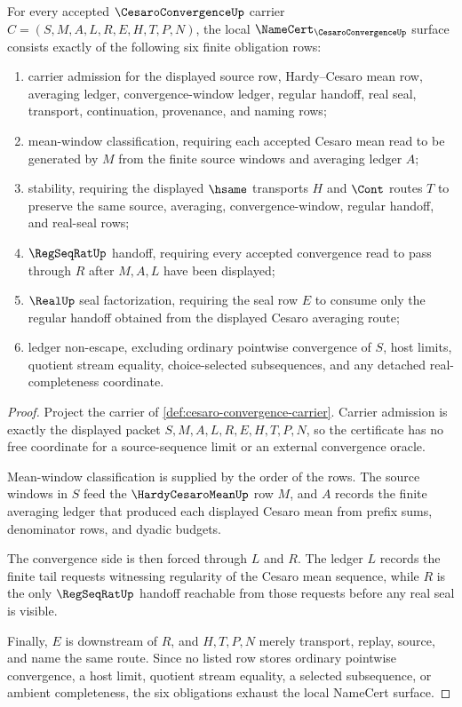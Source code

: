 \begin{theorem}\label{thm:cesaro-convergence-namecert-obligations}
For every accepted $\CesaroConvergenceUp$ carrier $C=(S,M,A,L,R,E,H,T,P,N)$, the local $\NameCert_{\CesaroConvergenceUp}$ surface consists exactly of the following six finite obligation rows:
\begin{enumerate}
\item carrier admission for the displayed source row, Hardy--Cesaro mean row, averaging ledger, convergence-window ledger, regular handoff, real seal, transport, continuation, provenance, and naming rows;
\item mean-window classification, requiring each accepted Cesaro mean read to be generated by $M$ from the finite source windows and averaging ledger $A$;
\item stability, requiring the displayed $\hsame$ transports $H$ and $\Cont$ routes $T$ to preserve the same source, averaging, convergence-window, regular handoff, and real-seal rows;
\item $\RegSeqRatUp$ handoff, requiring every accepted convergence read to pass through $R$ after $M,A,L$ have been displayed;
\item $\RealUp$ seal factorization, requiring the seal row $E$ to consume only the regular handoff obtained from the displayed Cesaro averaging route;
\item ledger non-escape, excluding ordinary pointwise convergence of $S$, host limits, quotient stream equality, choice-selected subsequences, and any detached real-completeness coordinate.
\end{enumerate}
\end{theorem}
\begin{proof}
Project the carrier of \autoref{def:cesaro-convergence-carrier}. Carrier admission is exactly the displayed packet $S,M,A,L,R,E,H,T,P,N$, so the certificate has no free coordinate for a source-sequence limit or an external convergence oracle.

Mean-window classification is supplied by the order of the rows. The source windows in $S$ feed the $\HardyCesaroMeanUp$ row $M$, and $A$ records the finite averaging ledger that produced each displayed Cesaro mean from prefix sums, denominator rows, and dyadic budgets.

The convergence side is then forced through $L$ and $R$. The ledger $L$ records the finite tail requests witnessing regularity of the Cesaro mean sequence, while $R$ is the only $\RegSeqRatUp$ handoff reachable from those requests before any real seal is visible.

Finally, $E$ is downstream of $R$, and $H,T,P,N$ merely transport, replay, source, and name the same route. Since no listed row stores ordinary pointwise convergence, a host limit, quotient stream equality, a selected subsequence, or ambient completeness, the six obligations exhaust the local NameCert surface.
\end{proof}

